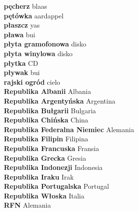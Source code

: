 \textbf{ pęcherz  } blaas \\
\textbf{ pętówka  } aardappel \\
\textbf{ płaszcz  } yas \\
\textbf{ pława  } bui \\
\textbf{ płyta gramofonowa  } disko \\
\textbf{ płyta winylowa  } disko \\
\textbf{ płytka  } CD \\
\textbf{ pływak  } bui \\
\textbf{ rajski ogród  } cielo \\
\textbf{ Republika Albanii  } Albania \\
\textbf{ Republika Argentyńska  } Argentina \\
\textbf{ Republika Bułgarii  } Bulgaria \\
\textbf{ Republika Chińska  } China \\
\textbf{ Republika Federalna Niemiec  } Alemania \\
\textbf{ Republika Filipin  } Filipina \\
\textbf{ Republika Francuska  } Fransia \\
\textbf{ Republika Grecka  } Gresia \\
\textbf{ Republika Indonezji  } Indonesia \\
\textbf{ Republika Iraku  } Irak \\
\textbf{ Republika Portugalska  } Portugal \\
\textbf{ Republika Włoska  } Italia \\
\textbf{ RFN  } Alemania \\

